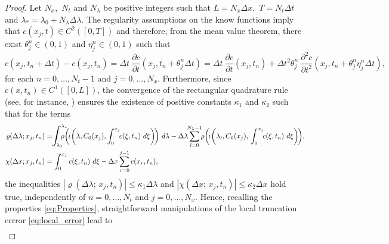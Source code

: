 \documentclass[a4paper, UKenglish, numberwithinsect, thm-restate]{tgdk-v2021}
\begin{document}
\begin{proof}
    Let $N_x,$ $N_t$ and $N_\lambda$ be positive integers such that $L=N_x \Delta x,$ $T=N_t \Delta t$ and $\lambda_{*} =\lambda_{0}+ N_\lambda \Delta \lambda.$
    The regularity assumptions on the know functions imply that $c(x_j,t)\in C^2([0,T])$ and therefore, from the mean value theorem, there exist $\theta_j^n\in (0,1)$ and $\eta_j^n\in (0,1)$ such that 
    \begin{equation*}
        c(x_j,t_{n}+\Delta t)-c(x_j,t_{n})=\Delta t \ \dfrac{\partial c}{\partial t}(x_j,t_{n}+\theta_j^n\Delta t)=\Delta t \ \dfrac{\partial c}{\partial t}(x_j,t_{n}) + \Delta t^2 \theta_j^n \ \dfrac{\partial^2 c}{\partial t^2}(x_j,t_{n}+\theta_j^n\eta_j^n\Delta t), 
    \end{equation*} 
    for each $n=0,\dots, N_t-1$ and $j=0,\dots, N_x.$
    Furthermore, since $c(x,t_n)\in C^1([0,L])$, the convergence of the rectangular quadrature rule (see, for instance, \cite{Davis}) ensures the existence of positive constants $\kappa_1$ and $\kappa_2$ such that for the terms
    \begin{equation*}
        \begin{split}
            \varrho(\Delta \lambda; x_j, t_n)&= \!\! \scalebox{1.3}{$\displaystyle\int$}_{\!\!\!\!\! \lambda_{0}}^{\lambda_{*}} \!\!\!\!\!\! \rho \! \left(\! \iota \! \left(\lambda, C_0(x_j), \int_0^{x_j} \!\! c(\xi,t_n)  \ d\xi\right)\!\right) \, d\lambda - \Delta \lambda \! \!\sum_{l=0} ^{N_\lambda-1} \! \! \rho \! \left( \! \iota \! \left(\lambda_l, C_0(x_j) ,\, \int_0^{x_j}  \!\!  c(\xi,t_n)  \ d\xi \right)\!\right) \! ,  \\
            \chi(\Delta x; x_j, t_n)&=\int_0^{x_j}    c(\xi,t_n)  \ d\xi-\Delta x \sum_{r=0}^{j-1}c(x_r,t_{n}),
        \end{split}
    \end{equation*}
    the inequalities $|\varrho(\Delta \lambda; \, x_j, t_n)|\leq \kappa_1 \Delta \lambda$ and $|\chi(\Delta x; \, x_j, t_n)|\leq \kappa_2 \Delta x$ hold true, independently of $n=0,\dots, N_t$ and $j=0,\dots, N_x.$ Hence, recalling the properties \eqref{eq:Properties}, straightforward manipulations of the local truncation errror \eqref{eq:local_error} lead to
    \begin{equation*}
        \begin{split}

\end{split}
\end{equation*}
\end{proof}
\end{document}
